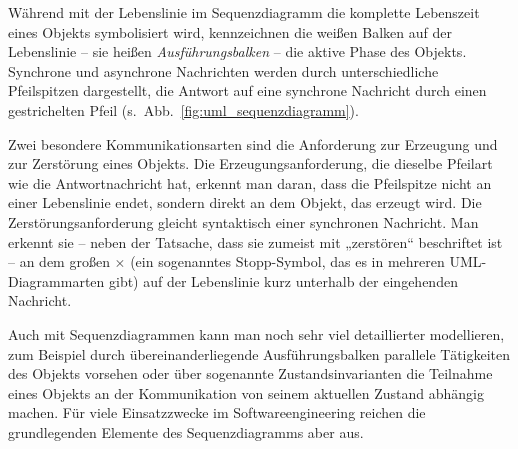 Während mit der Lebenslinie im Sequenzdiagramm die komplette Lebenszeit eines Objekts symbolisiert wird, kennzeichnen die weißen Balken auf der Lebenslinie -- sie heißen \textit{Ausführungsbalken}
-- die aktive Phase des Objekts. Synchrone und asynchrone Nachrichten werden durch unterschiedliche Pfeilspitzen dargestellt, die Antwort auf eine synchrone Nachricht durch einen gestrichelten Pfeil (s.~Abb.~\ref{fig:uml_sequenzdiagramm}). 

\pagebreak %

Zwei besondere Kommunikationsarten sind die Anforderung zur Erzeugung 
und zur Zerstörung eines Objekts. Die Erzeugungsanforderung, die dieselbe Pfeilart wie die Antwortnachricht hat, erkennt man daran, dass die Pfeilspitze nicht an einer Lebenslinie endet, sondern direkt an dem Objekt, das erzeugt wird. Die Zerstörungsanforderung gleicht syntaktisch einer synchronen Nachricht. Man erkennt sie -- neben der Tatsache, dass sie zumeist mit „zerstören“ beschriftet ist -- an dem großen {\Large$\times$} (ein sogenanntes Stopp-Symbol, das es in mehreren UML-Diagrammarten gibt) auf der Lebenslinie kurz unterhalb der eingehenden Nachricht.

Auch mit Sequenzdiagrammen kann man noch sehr viel detaillierter modellieren, zum Beispiel durch übereinanderliegende Ausführungsbalken parallele Tätigkeiten des Objekts vorsehen oder über sogenannte Zustandsinvarianten die Teilnahme eines Objekts an der Kommunikation von seinem aktuellen Zustand abhängig machen. Für viele Einsatzzwecke im Softwareengineering reichen die grundlegenden Elemente des Sequenzdiagramms aber aus.

